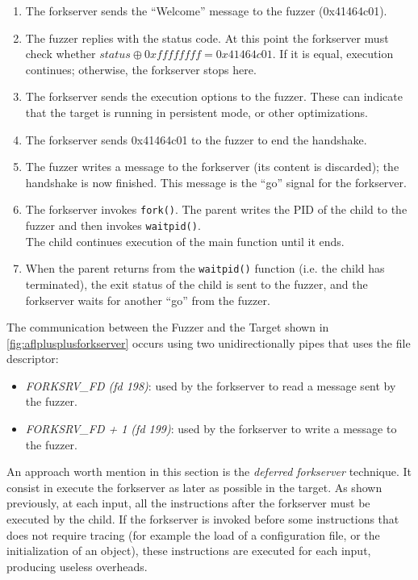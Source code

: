         \begin{enumerate}
            \item The forkserver sends the ``Welcome'' message to the fuzzer (0x41464c01).
            \item The fuzzer replies with the status code. At this point the forkserver must check whether $status \oplus 0xffffffff = 0x41464c01$.
                    If it is equal, execution continues; otherwise, the forkserver stops here.
            \item The forkserver sends the execution options to the fuzzer.
                These can indicate that the target is running in persistent mode, or other optimizations.
            \item The forkserver sends 0x41464c01 to the fuzzer to end the handshake.
            \item The fuzzer writes a message to the forkserver (its content is discarded); the handshake is now finished.
                        This message is the ``go'' signal for the forkserver.
            \item The forkserver invokes \texttt{fork()}. The parent writes the PID of the child to the fuzzer and then invokes \texttt{waitpid()}.\\
                    The child continues execution of the main function until it ends.
            \item When the parent returns from the \texttt{waitpid()} function (i.e. the child has terminated), the exit status
            of the child is sent to the fuzzer, and the forkserver waits for another ``go'' from the fuzzer.
        \end{enumerate}
        The communication between the Fuzzer and the Target shown in \cref{fig:aflplusplusforkserver} occurs
        using two unidirectionally pipes that uses the file descriptor:
        \begin{itemize}
            \item \textit{FORKSRV\_FD (fd 198)}: used by the forkserver to read a message sent by the fuzzer.
            \item \textit{FORKSRV\_FD + 1 (fd 199)}: used by the forkserver to write a message to the fuzzer.
        \end{itemize}
        
        An approach worth mention in this section is the \textit{deferred forkserver} technique.
        It consist in execute the forkserver as later as possible in the target. 
        As shown previously, at each input, all the instructions after the forkserver must be executed by the child. 
        If the forkserver is invoked before some instructions that does not require tracing (for example the load of a 
        configuration file, or the initialization of an object), these instructions are executed for each input, 
        producing useless overheads.